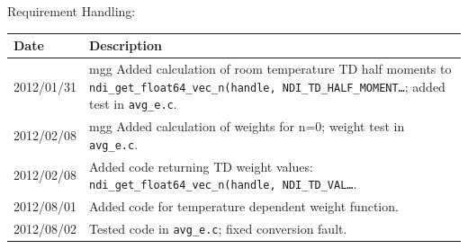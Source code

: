 Requirement Handling:

\begin{tabular}{|p{72pt}|p{351pt}|} \hline
Date & Description \\ \hline 
2012/01/31 & mgg Added calculation of
room temperature TD half moments to
\texttt{ndi\_get\_float64\_vec\_n(handle,
NDI\_TD\_HALF\_MOMENT\ldots}; added test in \texttt{avg\_e.c}.\\
\hline

2012/02/08 & mgg Added calculation of weights for n=0; weight test in
\texttt{avg\_e.c}. \\ \hline
2012/02/08 & Added code returning TD weight values:
\texttt{ndi\_get\_float64\_vec\_n(handle,
  NDI\_TD\_VAL\ldots}.\\ \hline
2012/08/01 & Added code for temperature dependent weight function.\\ \hline
2012/08/02 & Tested code in \texttt{avg\_e.c}; fixed conversion fault.\\ \hline
\end{tabular}
